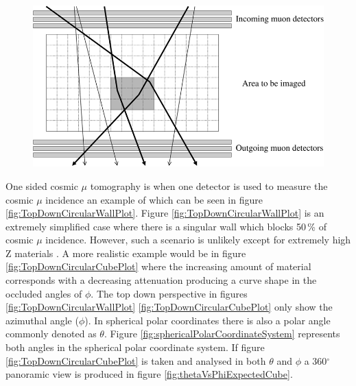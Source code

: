\begin{figure}[htbp]
 \centering
 \includegraphics[width=0.8\linewidth]{Chapter5/Figs/Raster/twoSidedCosmicMuon_schults2007.png}
 \label{fig:twoSidedCosmicMuonTomographySchults}
\end{figure}
 
 One sided cosmic $\mu$ tomography is when one detector is used to measure the cosmic $\mu$ incidence an example of which can be seen in figure \ref{fig:TopDownCircularWallPlot}. Figure \ref{fig:TopDownCircularWallPlot} is an extremely simplified case where there is a singular wall which blocks 50\,\% of cosmic $\mu$ incidence. However, such a scenario is unlikely except for extremely high Z materials \cite{schultz_2007}. A more realistic example would be in figure \ref{fig:TopDownCircularCubePlot} where the increasing amount of material corresponds with a decreasing attenuation producing a curve shape in the occluded angles of $\phi$. The top down perspective in figures \ref{fig:TopDownCircularWallPlot} \ref{fig:TopDownCircularCubePlot} only show the azimuthal angle ($\phi$). In spherical polar coordinates there is also a polar angle commonly denoted as $\theta$. Figure \ref{fig:sphericalPolarCoordinateSystem} represents both angles in the spherical polar coordinate system. If figure \ref{fig:TopDownCircularCubePlot} is taken and analysed in both $\theta$ and $\phi$ a 360$^\circ$ panoramic view is produced in figure \ref{fig:thetaVsPhiExpectedCube}.
 
